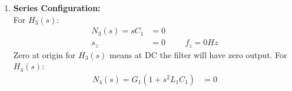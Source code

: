 \begin{enumerate}
\begin{enumerate}
          \begin{align*}
            H_1(s) &= \frac{G_1}{G_1 + \frac{1}{sL_1} + sC_1} \cdot \frac{sL_1}{sL_1} = \frac{s L_1 G_1}{s^2 L_1 C_1 + s L_1 G_1 + 1} \\
            N_1(s) &= s L_1 G_1 = 0 \\
            s_z &= 0 \hspace{1cm} f_z = 0 Hz
          \end{align*}
          Zero at origin for \(H_1(s)\) means at DC the filter will have zero
          output (the inductor shorts the output to \(V_2\)). \\
        For band stop \(H_2(s)\):
          \begin{align*}
            H_2(s) &= \frac{\frac{1}{sL_1} + sC_1}{G_1 + \frac{1}{sL_1} + sC_1} \cdot \frac{sL_1}{sL_1} = \frac{1 + s^2 L_1 C_1}{s^2 L_1 C_1 + s L_1 G_1 + 1} \\
            N_2(s) &= 0 \\
            1 + s^2 L_1 C_1 &= 0 \hspace{1cm} \text{(Numerator of the cleared form)} \\
            s^2 + \frac{1}{L_1 C_1} &= 0 \hspace{1cm} \text{(Dividing by \(L_1 C_1\))} \\
            s^2 &= -\frac{1}{L_1 C_1} \\
            s &= \pm j\sqrt{\frac{1}{L_1 C_1}} \quad \text{[let \(s = s_z\)]} \\
            f_z = \frac{|s_z|}{2\pi} = \frac{\sqrt{\frac{1}{L_1 C_1}}}{2\pi} = \frac{1}{2\pi \sqrt{L_1 C_1}}
          \end{align*}
          Zero at natural frequency for \(H_2(s)\) lets the filter have zero
          output which is what we expect. \\
        \item \textbf{Series Configuration:}\\
        For \(H_3(s)\):
          \begin{align*}
            N_3(s) = sC_1 &= 0 \\
            s_z &= 0 \hspace{1cm} f_z = 0 Hz
          \end{align*}
          Zero at origin for \(H_3(s)\) means at DC the filter will have
          zero output.
        For \(H_4(s)\):
          \begin{align*}
            N_4(s) = G_1(1 + s^2 L_1 C_1) &= 0 \\

\end{align*}
\end{enumerate}
\end{enumerate}
